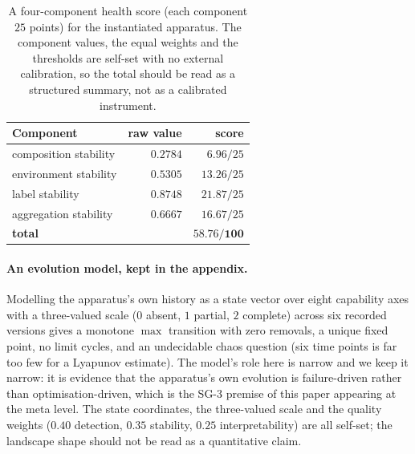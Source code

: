 \documentclass{article}
\begin{document}
\begin{table}[h]
\centering
\small
\caption{A four-component health score (each component $25$ points) for the instantiated apparatus. The
component values, the equal weights and the thresholds are self-set with no external calibration, so the
total should be read as a structured summary, not as a calibrated instrument.}
\label{tab:health}
\begin{tabular}{@{}lrr@{}}
\toprule
Component & raw value & score \\
\midrule
composition stability & $0.2784$ & $6.96/25$ \\
environment stability & $0.5305$ & $13.26/25$ \\
label stability & $0.8748$ & $21.87/25$ \\
aggregation stability & $0.6667$ & $16.67/25$ \\
\midrule
\textbf{total} & & $\mathbf{58.76/100}$ \\
\bottomrule
\end{tabular}
\end{table}

\paragraph{An evolution model, kept in the appendix.} Modelling the apparatus's own history as a state
vector over eight capability axes with a three-valued scale ($0$ absent, $1$ partial, $2$ complete) across
six recorded versions gives a monotone $\max$ transition with zero removals, a unique fixed point, no limit
cycles, and an undecidable chaos question (six time points is far too few for a Lyapunov estimate). The
model's role here is narrow and we keep it narrow: it is evidence that the apparatus's own evolution is
failure-driven rather than optimisation-driven, which is the SG-3 premise of this paper appearing at the
meta level. The state coordinates, the three-valued scale and the quality weights ($0.40$ detection,
$0.35$ stability, $0.25$ interpretability) are all self-set; the landscape shape should not be read as a
quantitative claim.

\end{document}
